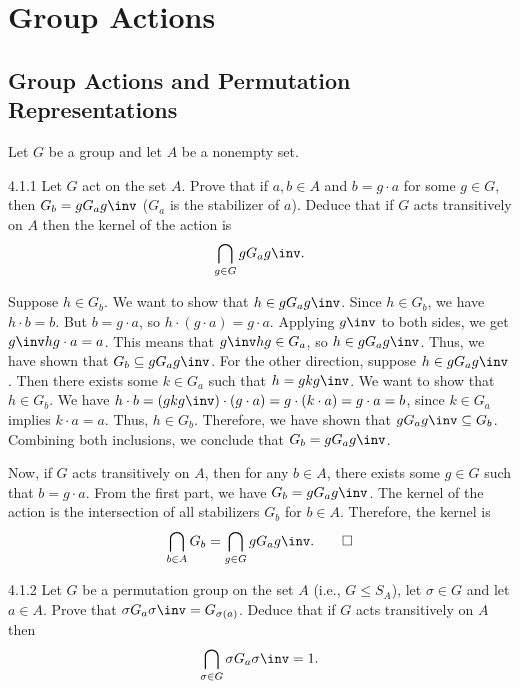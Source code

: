 \section{Group Actions}

\subsection{Group Actions and Permutation Representations}

Let $G$ be a group and let $A$ be a nonempty set.

\begin{exercise}{4.1.1}
	Let $G$ act on the set $A$.
	Prove that if $a,b \in A$ and $b = g \cdot a$ for some $g \in G$, then \(G_b = g G_a g\inv\) (\(G_a\) is the stabilizer of $a$).
	Deduce that if $G$ acts transitively on $A$ then the kernel of the action is
	\[
		\bigcap_{g \in G} g G_a g\inv.
	\]
\end{exercise}

\begin{sol}
	Suppose $h \in G_b$.
	We want to show that $h \in gG_ag\inv$.
	Since $h \in G_b$, we have $h \cdot b = b$.
	But $b = g \cdot a$, so $h \cdot (g \cdot a) = g \cdot a$.
	Applying $g\inv$ to both sides, we get $g\inv h g \cdot a = a$.
	This means that $g\inv h g \in G_a$, so $h \in g G_a g\inv$.
	Thus, we have shown that \(G_b \subseteq g G_a g\inv\).
	For the other direction, suppose $h \in g G_a g\inv$.
	Then there exists some $k \in G_a$ such that $h = g k g\inv$.
	We want to show that $h \in G_b$.
	We have $h \cdot b = (g k g\inv) \cdot (g \cdot a) = g \cdot (k \cdot a) = g \cdot a = b$, since $k \in G_a$ implies $k \cdot a = a$.
	Thus, $h \in G_b$.
	Therefore, we have shown that \(g G_a g\inv \subseteq G_b\).
	Combining both inclusions, we conclude that \(G_b = g G_a g\inv\).

	Now, if $G$ acts transitively on $A$, then for any $b \in A$, there exists some $g \in G$ such that $b = g \cdot a$.
	From the first part, we have \(G_b = g G_a g\inv\).
	The kernel of the action is the intersection of all stabilizers \(G_b\) for \(b \in A\).
	Therefore, the kernel is
	\[
		\bigcap_{b \in A} G_b = \bigcap_{g \in G} g G_a g\inv. \qedhere
	\]
\end{sol}

\begin{exercise}{4.1.2}
	Let $G$ be a permutation group on the set $A$ (i.e., \(G \leq S_A\)), let \(\sigma \in G\) and let \(a \in A\).
	Prove that \(\sigma G_a \sigma\inv = G_{\sigma(a)}\).
	Deduce that if $G$ acts transitively on $A$ then 
	\[
		\bigcap_{\sigma \in G} \sigma G_a \sigma\inv = 1.
	\]
\end{exercise}

